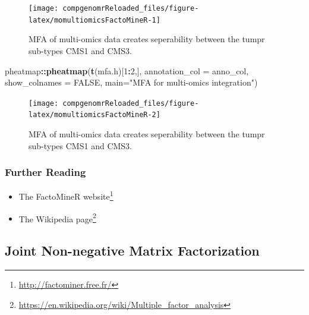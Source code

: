 \documentclass[12pt,]{krantz}
\newenvironment{Shaded}{\begin{snugshade}}{\end{snugshade}}
\newcommand{\DataTypeTok}[1]{\textcolor[rgb]{0.13,0.29,0.53}{#1}}
\newcommand{\DecValTok}[1]{\textcolor[rgb]{0.00,0.00,0.81}{#1}}
\newcommand{\KeywordTok}[1]{\textcolor[rgb]{0.13,0.29,0.53}{\textbf{#1}}}
\newcommand{\NormalTok}[1]{#1}
\newcommand{\OperatorTok}[1]{\textcolor[rgb]{0.81,0.36,0.00}{\textbf{#1}}}
\newcommand{\OtherTok}[1]{\textcolor[rgb]{0.56,0.35,0.01}{#1}}
\newcommand{\StringTok}[1]{\textcolor[rgb]{0.31,0.60,0.02}{#1}}
\providecommand{\tightlist}{%
  \setlength{\itemsep}{0pt}\setlength{\parskip}{0pt}}
\renewcommand{\href}[2]{#2\footnote{\url{#1}}}
\begin{document}
\begin{figure}

{\centering \texttt{[image: compgenomrReloaded\_files/figure-latex/momultiomicsFactoMineR-1]} 

}

\caption{MFA of multi-omics data creates seperability between the tumpr sub-types CMS1 and CMS3. }\label{fig:momultiomicsFactoMineR1}
\end{figure}

\begin{Shaded}
\begin{Highlighting}[]
\NormalTok{pheatmap}\OperatorTok{::}\KeywordTok{pheatmap}\NormalTok{(}\KeywordTok{t}\NormalTok{(mfa.h)[}\DecValTok{1}\OperatorTok{:}\DecValTok{2}\NormalTok{,], }\DataTypeTok{annotation_col =}\NormalTok{ anno_col, }\DataTypeTok{show_colnames =} \OtherTok{FALSE}\NormalTok{,}
         \DataTypeTok{main=}\StringTok{"MFA for multi-omics integration"}\NormalTok{)}
\end{Highlighting}
\end{Shaded}

\begin{figure}

{\centering \texttt{[image: compgenomrReloaded\_files/figure-latex/momultiomicsFactoMineR-2]} 

}

\caption{MFA of multi-omics data creates seperability between the tumpr sub-types CMS1 and CMS3. }\label{fig:momultiomicsFactoMineR2}
\end{figure}

\hypertarget{further-reading}{%
\subsubsection{Further Reading}\label{further-reading}}

\begin{itemize}
\tightlist
\item
  \href{http://factominer.free.fr/}{The FactoMineR website}
\item
  \href{https://en.wikipedia.org/wiki/Multiple_factor_analysis}{The Wikipedia page}
\end{itemize}

\hypertarget{joint-non-negative-matrix-factorization}{%
\subsection{Joint Non-negative Matrix Factorization}\label{joint-non-negative-matrix-factorization}}
\end{document}
